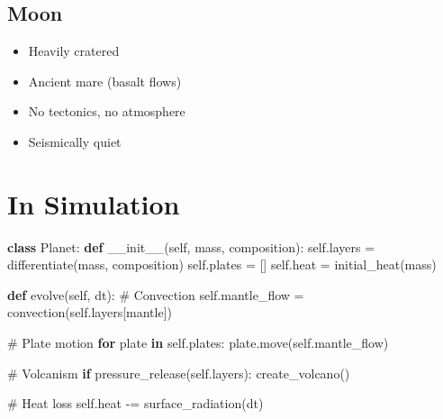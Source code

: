 \documentclass[
  11pt,
  letterpaper,
  twoside,
  openright]{book}
\newenvironment{Shaded}{\begin{snugshade}}{\end{snugshade}}
\newcommand{\CommentTok}[1]{\textcolor[rgb]{0.37,0.37,0.37}{#1}}
\newcommand{\ControlFlowTok}[1]{\textcolor[rgb]{0.00,0.23,0.31}{\textbf{#1}}}
\newcommand{\FunctionTok}[1]{\textcolor[rgb]{0.28,0.35,0.67}{#1}}
\newcommand{\KeywordTok}[1]{\textcolor[rgb]{0.00,0.23,0.31}{\textbf{#1}}}
\newcommand{\NormalTok}[1]{\textcolor[rgb]{0.00,0.23,0.31}{#1}}
\newcommand{\OperatorTok}[1]{\textcolor[rgb]{0.37,0.37,0.37}{#1}}
\newcommand{\StringTok}[1]{\textcolor[rgb]{0.13,0.47,0.30}{#1}}
\newcommand{\VariableTok}[1]{\textcolor[rgb]{0.07,0.07,0.07}{#1}}
\providecommand{\tightlist}{%
  \setlength{\itemsep}{0pt}\setlength{\parskip}{0pt}}
\begin{document}
\subsection{Moon}\label{moon}

\begin{itemize}
\tightlist
\item
  Heavily cratered
\item
  Ancient mare (basalt flows)
\item
  No tectonics, no atmosphere
\item
  Seismically quiet
\end{itemize}

\section{In Simulation}\label{in-simulation-9}

\begin{Shaded}
\begin{Highlighting}[]
\KeywordTok{class}\NormalTok{ Planet:}
    \KeywordTok{def} \FunctionTok{\_\_init\_\_}\NormalTok{(}\VariableTok{self}\NormalTok{, mass, composition):}
        \VariableTok{self}\NormalTok{.layers }\OperatorTok{=}\NormalTok{ differentiate(mass, composition)}
        \VariableTok{self}\NormalTok{.plates }\OperatorTok{=}\NormalTok{ []}
        \VariableTok{self}\NormalTok{.heat }\OperatorTok{=}\NormalTok{ initial\_heat(mass)}

    \KeywordTok{def}\NormalTok{ evolve(}\VariableTok{self}\NormalTok{, dt):}
        \CommentTok{\# Convection}
        \VariableTok{self}\NormalTok{.mantle\_flow }\OperatorTok{=}\NormalTok{ convection(}\VariableTok{self}\NormalTok{.layers[}\StringTok{\textquotesingle{}mantle\textquotesingle{}}\NormalTok{])}

        \CommentTok{\# Plate motion}
        \ControlFlowTok{for}\NormalTok{ plate }\KeywordTok{in} \VariableTok{self}\NormalTok{.plates:}
\NormalTok{            plate.move(}\VariableTok{self}\NormalTok{.mantle\_flow)}

        \CommentTok{\# Volcanism}
        \ControlFlowTok{if}\NormalTok{ pressure\_release(}\VariableTok{self}\NormalTok{.layers):}
\NormalTok{            create\_volcano()}

        \CommentTok{\# Heat loss}
        \VariableTok{self}\NormalTok{.heat }\OperatorTok{{-}=}\NormalTok{ surface\_radiation(dt)}
\end{Highlighting}
\end{Shaded}
\end{document}

